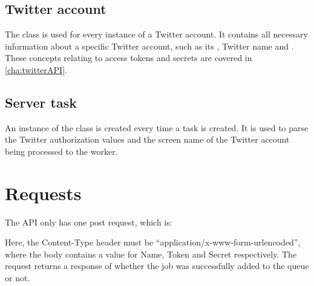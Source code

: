 \subsection{Twitter account}
The class  is used for every instance of a Twitter account. It
contains all necessary information about a specific Twitter account, such as its
, Twitter name and . These
concepts relating to access tokens and secrets are covered in
\autoref{cha:twitterAPI}.

\subsection{Server task}
An instance of the class  is created every time a task is
created. It is used to parse the Twitter authorization values and the screen
name of the Twitter account being processed to the worker.

\section{Requests}
The \ac{API} only has one post request, which is: \nl

\nl

Here, the Content-Type header must be ``application/x-www-form-urlencoded'',
where the body contains a value for Name, Token and Secret
respectively.
The request returns a response of whether the job was successfully added to the
queue or not.



